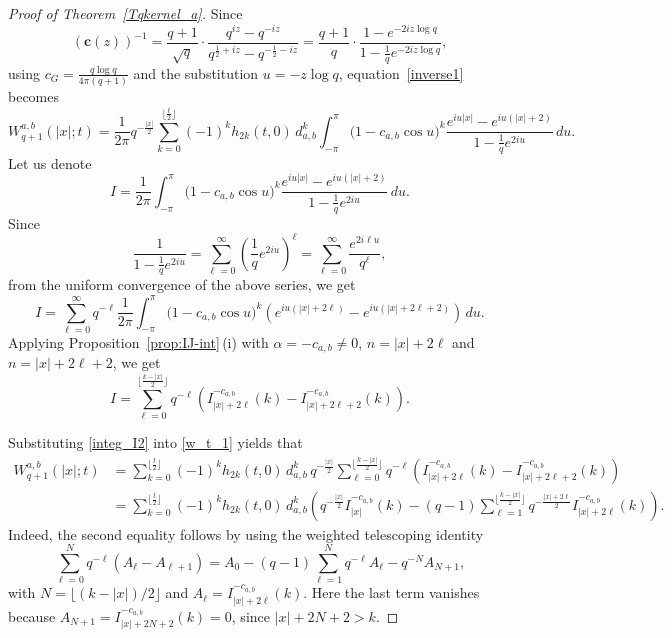 \documentclass[12pt]{amsart}
\numberwithin{equation}{section}
\theoremstyle{boldremark}
\begin{document}
\begin{proof}[Proof of Theorem~\ref{Tqkernel_a}]
Since
\begin{equation*}
   \left(\boldsymbol{c}(z)\right)^{-1}=\frac{q+1}{\sqrt{q}} \cdot \frac{q^{iz}-q^{-iz}}{q^{\frac{1}{2} + iz} - q^{-\frac{1}{2} - iz}}=
\frac{q+1}{q}  \cdot \frac{1-e^{-2iz\log{q}}}{1-\frac{1}{q}e^{-2iz\log{q}}},
\end{equation*}
using $c_G=\frac{q\log{q}}{4\pi(q+1)}$ and the substitution $u = -z\log{q}$, equation~\eqref{inverse1} becomes
\begin{equation}\label{w_t_1}
W^{a,b}_{q+1}\left(|x|;t\right)
=\frac{1}{2\pi}q^{-\frac{|x|}{2}}\sum_{k=0}^{\lfloor \frac{t}{2} \rfloor} (-1)^k h_{2k}\left(t,0\right)\,d_{a,b}^k
\int_{-\pi}^{\pi} \Big(1- c_{a,b}\cos u\Big)^{k} \frac{e^{iu|x|}-e^{iu(|x|+2)}}{1-\frac{1}{q}e^{2iu}} \,du.
\end{equation}
Let us denote
$$I=\frac{1}{2\pi}\int_{-\pi}^{\pi} \Big(1- c_{a,b}\cos u\Big)^{k} \frac{e^{iu|x|}-e^{iu(|x|+2)}}{1-\frac{1}{q}e^{2iu}} \,du.$$
Since
$$
\frac{1}{1 - \frac{1}{q} e^{2iu}} = \sum_{\ell=0}^{\infty} \left(\frac{1}{q} e^{2iu}\right)^\ell = \sum_{\ell=0}^{\infty} \frac{e^{2i \ell u}}{q^\ell},
$$
from the uniform convergence of the above series, we get
\begin{equation}\label{integ_I}
I=\sum_{\ell=0}^{\infty} q^{-\ell} \frac{1}{2\pi}\int_{-\pi}^{\pi} \Big(1- c_{a,b}\cos u\Big)^{k} \left(e^{iu(|x|+2\ell)} - e^{iu(|x|+2\ell+2)} \right) \,du.
\end{equation}
Applying Proposition~\ref{prop:IJ-int}\,(i) with $\alpha=-c_{a,b}\neq 0$, $n=|x|+2\ell$ and $n=|x|+2\ell+2$, we get
\begin{equation}\label{integ_I2}
I
= \sum_{\ell=0}^{\lfloor\frac{k-|x|}{2}\rfloor} q^{-\ell} \left(I_{|x|+2\ell}^{-c_{a,b}}(k)-I_{|x|+2\ell+2}^{-c_{a,b}}(k)\right).
\end{equation}

Substituting \eqref{integ_I2} into \eqref{w_t_1} yields that
\begin{equation*}
\begin{split}
W_{q+1}^{a,b}(|x|;t)
&= \sum_{k=0}^{\lfloor \frac{t}{2} \rfloor} (-1)^{k} h_{2k}(t,0)\,d_{a,b}^k\,q^{-\frac{|x|}{2}}
\sum_{\ell=0}^{\lfloor \frac{k - |x|}{2} \rfloor} q^{-\ell} \left( I_{|x|+2\ell}^{-c_{a,b}}(k) - I_{|x|+2\ell+2}^{-c_{a,b}}(k) \right)\\
&= \sum_{k=0}^{\lfloor \frac{t}{2} \rfloor} (-1)^{k} h_{2k}(t,0)\,d_{a,b}^k \left( q^{-\frac{|x|}{2}} I_{|x|}^{-c_{a,b}}(k) - (q-1) \sum_{\ell=1}^{\lfloor \frac{k - |x|}{2} \rfloor} q^{-\frac{|x|+2\ell}{2}} I_{|x|+2\ell}^{-c_{a,b}}(k) \right).
\end{split}
\end{equation*}
Indeed, the second equality follows by using the weighted telescoping identity 
\[ \sum_{\ell=0}^{N}q^{-\ell}(A_\ell-A_{\ell+1}) = A_0-(q-1)\sum_{\ell=1}^{N}q^{-\ell}A_\ell-q^{-N}A_{N+1},
\]
with $N=\lfloor (k-|x|)/2\rfloor$ and $A_\ell=I_{|x|+2\ell}^{-c_{a,b}}(k)$. Here the last term vanishes because $A_{N+1}=I_{|x|+2N+2}^{-c_{a,b}}(k)=0$, since $|x|+2N+2>k$.


\end{proof}
\end{document}
